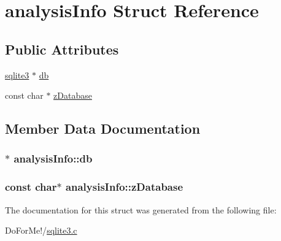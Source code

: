 \hypertarget{structanalysis_info}{\section{analysis\-Info Struct Reference}
\label{structanalysis_info}
}
\subsection*{Public Attributes}
\begin{DoxyCompactItemize}
\item 
\hyperlink{structsqlite3}{sqlite3} $\ast$ \hyperlink{structanalysis_info_a13108eadc55ffe73a8825fb91cc0f9b5}{db}
\item 
const char $\ast$ \hyperlink{structanalysis_info_accbe3c1f5613ffa13b9578e58a5d850a}{z\-Database}
\end{DoxyCompactItemize}


\subsection{Member Data Documentation}
\hypertarget{structanalysis_info_a13108eadc55ffe73a8825fb91cc0f9b5}{
\subsubsection[{db}]{$\ast$ analysis\-Info\-::db}}\label{structanalysis_info_a13108eadc55ffe73a8825fb91cc0f9b5}
\hypertarget{structanalysis_info_accbe3c1f5613ffa13b9578e58a5d850a}{
\subsubsection[{z\-Database}]{\setlength{\rightskip}{0pt plus 5cm}const char$\ast$ analysis\-Info\-::z\-Database}}\label{structanalysis_info_accbe3c1f5613ffa13b9578e58a5d850a}


The documentation for this struct was generated from the following file\-:\begin{DoxyCompactItemize}
\item 
Do\-For\-Me!/\hyperlink{sqlite3_8c}{sqlite3.\-c}\end{DoxyCompactItemize}
